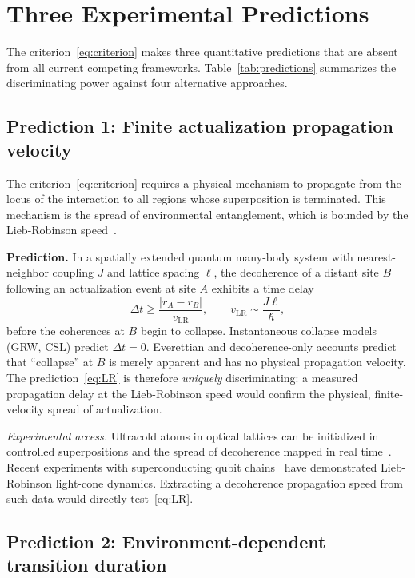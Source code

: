 \documentclass[11pt,twocolumn]{article}
\newcommand{\vLR}{v_{\mathrm{LR}}}
\begin{document}
\section{Three Experimental Predictions}
\label{sec:predictions}

The criterion~\eqref{eq:criterion} makes three quantitative
predictions that are absent from all current competing frameworks.
Table~\ref{tab:predictions} summarizes the discriminating power
against four alternative approaches.

\subsection{Prediction 1: Finite actualization propagation velocity}

The criterion~\eqref{eq:criterion} requires a physical mechanism
to propagate from the locus of the interaction to all regions
whose superposition is terminated.
This mechanism is the spread of environmental entanglement,
which is bounded by the Lieb-Robinson speed~\cite{LiebRobinson1972}.

\textbf{Prediction.}
In a spatially extended quantum many-body system with
nearest-neighbor coupling $J$ and lattice spacing $\ell$, the
decoherence of a distant site $B$ following an actualization event
at site $A$ exhibits a time delay
\begin{equation}
  \Delta t \geq \frac{|r_A - r_B|}{\vLR},
  \qquad \vLR \sim \frac{J\ell}{\hbar},
  \label{eq:LR}
\end{equation}
before the coherences at $B$ begin to collapse.
Instantaneous collapse models (GRW, CSL) predict $\Delta t = 0$.
Everettian and decoherence-only accounts predict that
``collapse'' at $B$ is merely apparent and has no physical
propagation velocity.
The prediction~\eqref{eq:LR} is therefore \emph{uniquely}
discriminating: a measured propagation delay at the Lieb-Robinson
speed would confirm the physical, finite-velocity spread of
actualization.

\emph{Experimental access.}
Ultracold atoms in optical lattices can be initialized in
controlled superpositions and the spread of decoherence mapped
in real time~\cite{Cheneau2012}. Recent experiments with
superconducting qubit chains~\cite{Mi2022} have demonstrated
Lieb-Robinson light-cone dynamics. Extracting a decoherence
propagation speed from such data would directly test~\eqref{eq:LR}.

\subsection{Prediction 2: Environment-dependent transition duration}
\end{document}
